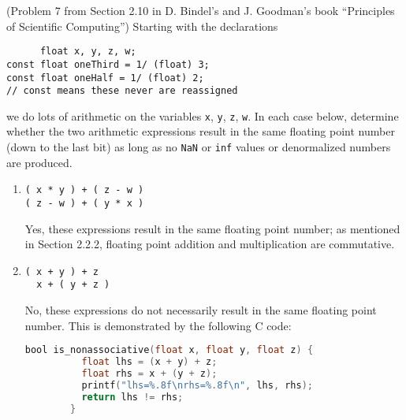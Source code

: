 \documentclass{../../../kin_math}
\begin{document}
\begin{questions}
  \question (Problem 7 from Section 2.10 in D. Bindel's and J. Goodman's book ``Principles of Scientific Computing'') Starting with the declarations
  \begin{verbatim}
      float x, y, z, w;
const float oneThird = 1/ (float) 3;
const float oneHalf = 1/ (float) 2;
// const means these never are reassigned\end{verbatim}
  we do lots of arithmetic on the variables \texttt{x}, \texttt{y}, \texttt{z}, \texttt{w}. In each case below, determine whether the two arithmetic expressions result in the same floating point number (down to the last bit) as long as no \texttt{NaN} or \texttt{inf} values or denormalized numbers are produced.
  \begin{enumerate}
    \item \begin{verbatim}
( x * y ) + ( z - w )
( z - w ) + ( y * x )\end{verbatim}
    \begin{solution}
      Yes, these expressions result in the same floating point number; as mentioned in Section 2.2.2, floating point addition and multiplication are commutative.
    \end{solution}
    \item \begin{verbatim}
( x + y ) + z
  x + ( y + z )\end{verbatim}
    \begin{solution}
      No, these expressions do not necessarily result in the same floating point number. This is demonstrated by the following C code:
      \begin{lstlisting}[language=C]
        bool is_nonassociative(float x, float y, float z) {
          float lhs = (x + y) + z;
          float rhs = x + (y + z);
          printf("lhs=%.8f\nrhs=%.8f\n", lhs, rhs);
          return lhs != rhs;
        }


\end{lstlisting}
\end{solution}
\end{enumerate}
\end{questions}
\end{document}
